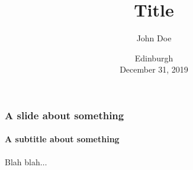\documentclass{beamer}
\title{Title}
\author{John Doe}
\begin{document}
\date{Edinburgh\\December 31, 2019}

\begin{frame}
  \titlepage
\end{frame}


\begin{frame}
  \frametitle{A slide about something}
  \framesubtitle{A subtitle about something}

  Blah blah$\ldots$
\end{frame}
\end{document}
